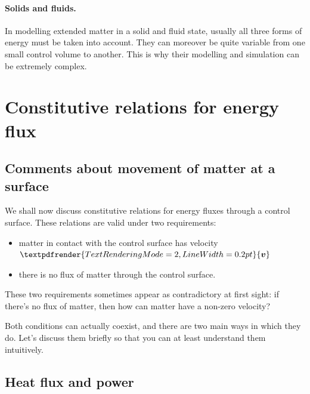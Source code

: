 \documentclass[a4paper,12pt,%
onecolumn,oneside,%
british%
]{memoir}
\renewcommand*{\bm}[1]{\textpdfrender{TextRenderingMode=2,LineWidth=0.2pt}{\boldsymbol{#1}}}
\renewcommand*{\|}[1][]{\nonscript\:#1\vert\nonscript\:\mathopen{}}
\newcommand*{\yv}{\bm{v}}
\begin{document}
\paragraph{Solids and fluids.}

In modelling extended matter in a solid and fluid state, usually all three forms of energy must be taken into account. They can moreover be quite variable from one small control volume to another. This is why their modelling and simulation can be extremely complex.

\section{Constitutive relations for energy flux}
\label{sec:energy_constitutive_flux}


\subsection{Comments about movement of matter at a surface}
\label{sec:matter_move_surface}

We shall now discuss constitutive relations for energy fluxes through a control surface. These relations are valid under two requirements:
\begin{itemize}[nosep]
\item matter in contact with the control surface has velocity $\yv$
\item there is no flux of matter through the control surface.
\end{itemize}

These two requirements sometimes appear as contradictory at first sight: if there's no flux of matter, then how can matter have a non-zero velocity?

Both conditions can actually coexist, and there are two main ways in which they do. Let's discuss them briefly so that you can at least understand them intuitively.


\subsection{Heat flux and power}
\label{sec:heating_power}
\end{document}
